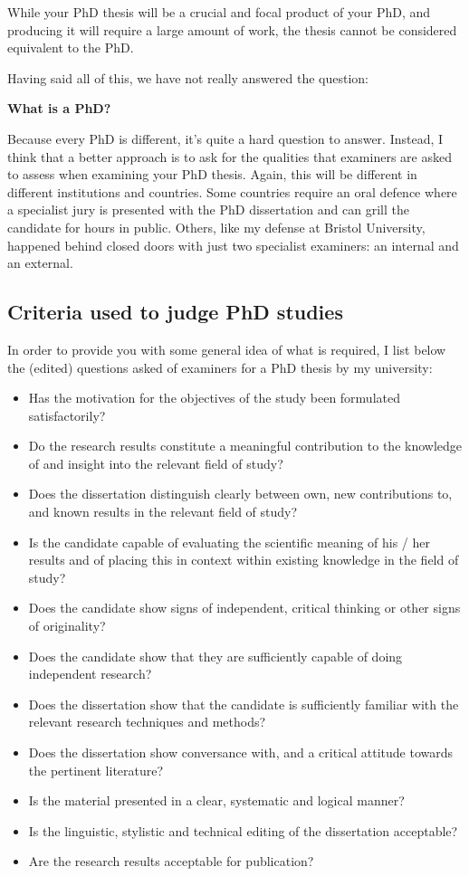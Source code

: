 \documentclass[
]{krantz}
\providecommand{\tightlist}{%
  \setlength{\itemsep}{0pt}\setlength{\parskip}{0pt}}
\begin{document}
While your PhD thesis will be a crucial and focal product of your PhD, and producing it will require a large amount of work, the thesis cannot be considered equivalent to the PhD.

Having said all of this, we have not really answered the question:

\textbf{What is a PhD?}

Because every PhD is different, it's quite a hard question to answer. Instead, I think that a better approach is to ask for the qualities that examiners are asked to assess when examining your PhD thesis. Again, this will be different in different institutions and countries. Some countries require an oral defence where a specialist jury is presented with the PhD dissertation and can grill the candidate for hours in public. Others, like my defense at Bristol University, happened behind closed doors with just two specialist examiners: an internal and an external.

\hypertarget{criteria-used-to-judge-phd-studies}{%
\subsection{Criteria used to judge PhD studies}\label{criteria-used-to-judge-phd-studies}}

In order to provide you with some general idea of what is required, I list below the (edited) questions asked of examiners for a PhD thesis by my university:

\begin{itemize}
\tightlist
\item
  Has the motivation for the objectives of the study been formulated satisfactorily?
\item
  Do the research results constitute a meaningful contribution to the knowledge of and insight into the relevant field of study?
\item
  Does the dissertation distinguish clearly between own, new contributions to, and known results in the relevant field of study?
\item
  Is the candidate capable of evaluating the scientific meaning of his / her results and of placing this in context within existing knowledge in the field of study?
\item
  Does the candidate show signs of independent, critical thinking or other signs of originality?
\item
  Does the candidate show that they are sufficiently capable of doing independent research?
\item
  Does the dissertation show that the candidate is sufficiently familiar with the relevant research techniques and methods?
\item
  Does the dissertation show conversance with, and a critical attitude towards the pertinent literature?
\item
  Is the material presented in a clear, systematic and logical manner?
\item
  Is the linguistic, stylistic and technical editing of the dissertation acceptable?
\item
  Are the research results acceptable for publication?
\end{itemize}
\end{document}
